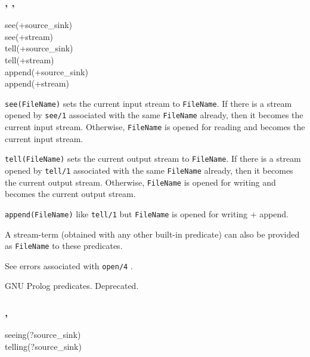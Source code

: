 \subsubsection{,
               ,
               }

\begin{TemplatesOneCol}
see(+source\_sink)\\
see(+stream)\\
tell(+source\_sink)\\
tell(+stream)\\
append(+source\_sink)\\
append(+stream)

\end{TemplatesOneCol}

\Description

\texttt{see(FileName)} sets the current input stream to \texttt{FileName}.
If there is a stream opened by \texttt{see/1} associated with the same
\texttt{FileName} already, then it becomes the current input stream.
Otherwise, \texttt{FileName} is opened for reading and becomes the current
input stream.

\texttt{tell(FileName)} sets the current output stream to \texttt{FileName}.
If there is a stream opened by \texttt{tell/1} associated with the same
\texttt{FileName} already, then it becomes the current output stream.
Otherwise, \texttt{FileName} is opened for writing and becomes the current
output stream.

\texttt{append(FileName)} like \texttt{tell/1} but
\texttt{FileName} is opened for writing + append.

A stream-term (obtained with any other built-in predicate) can also be
provided as \texttt{FileName} to these predicates.

\Errors

See errors associated with \texttt{open/4} .

\Portability

GNU Prolog predicates. Deprecated.

\subsubsection{,
               }

\begin{TemplatesOneCol}
seeing(?source\_sink)\\
telling(?source\_sink)

\end{TemplatesOneCol}

